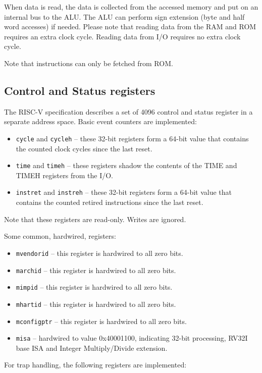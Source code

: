 \documentclass[12pt]{article}
\begin{document}
When data is read, the data is collected from the accessed memory and put on an internal bus to the ALU. The ALU can perform sign extension (byte and half word accesses) if needed. Please note that reading data from the RAM and ROM requires an extra clock cycle. Reading data from I/O requires no extra clock cycle.

Note that instructions can only be fetched from ROM.

\subsection{Control and Status registers}
The RISC-V specification describes a set of 4096 control and status register in a separate address space. Basic event counters are implemented:

\begin{itemize}
\item \texttt{cycle} and \texttt{cycleh} -- these 32-bit registers form a 64-bit value that contains the counted clock cycles since the last reset.
\item \texttt{time} and \texttt{timeh} -- these registers shadow the contents of the TIME and TIMEH registers from the I/O.
\item \texttt{instret} and \texttt{instreh} -- these 32-bit registers form a 64-bit value that contains the counted retired instructions since the last reset.
\end{itemize}

Note that these registers are read-only. Writes are ignored. 

Some common, hardwired, registers:
\begin{itemize}
\item \texttt{mvendorid} -- this register is hardwired to all zero bits.
\item \texttt{marchid} -- this register is hardwired to all zero bits.
\item \texttt{mimpid} -- this register is hardwired to all zero bits.
\item \texttt{mhartid} -- this register is hardwired to all zero bits.
\item \texttt{mconfigptr} -- this register is hardwired to all zero bits.
\item \texttt{misa} -- hardwired to value 0x40001100, indicating 32-bit processing, RV32I base ISA and Integer Multiply/Divide extension.
\end{itemize}

For trap handling, the following registers are implemented:
\end{document}
